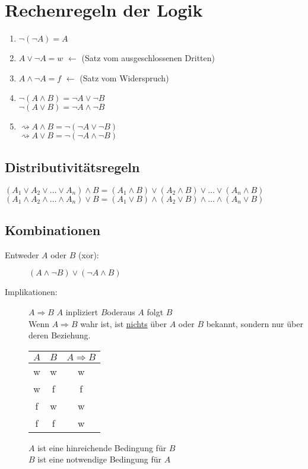 \section{Rechenregeln der Logik}
\begin{enumerate}
\item $\neg (\neg A) = A$
\item $A \vee \neg A = w$ $\leftarrow$ (Satz vom ausgeschlossenen Dritten)
\item $A \wedge \neg A = f$ $\leftarrow$ (Satz vom Widerspruch)
\item $\neg (A \wedge B) = \neg A \vee  \neg B$\\
$\neg (A \vee B) = \neg A \wedge \neg B$
\item $\rightsquigarrow A \wedge B = \neg (\neg A \vee \neg B)$\\
$\rightsquigarrow A \vee B = \neg ( \neg A \wedge \neg B)$
\end{enumerate}

\subsection{Distributivitätsregeln}
$(A_{1} \vee A_{2} \vee \dots \vee A_{n}) \wedge B = (A_{1} \wedge B ) \vee (A_{2} \wedge B) \vee \dots \vee (A_{n} \wedge B)$\\
$(A_{1} \wedge A_{2} \wedge \dots \wedge A_{n}) \vee B = (A_{1} \vee B ) \wedge (A_{2} \vee B) \wedge \dots \wedge (A_{n} \vee B)$

\subsection{Kombinationen}
\begin{description}
\item[Entweder $A$ oder $B$ (xor): ] $(A \wedge \neg B) \vee(\neg A \wedge B)$
\item[Implikationen: ] $A \Rightarrow B$ \glqq$A$ inpliziert $B$\grqq\quad oder\quad\glqq aus $A$ folgt $B$\grqq\\
Wenn $A \Rightarrow B$ wahr ist, ist \underline{nichts} über $A$ oder $B$ bekannt, sondern nur über deren Beziehung. \\
\begin{tabular}{cc|c}
 $A$ & $B$ & $A \Rightarrow B$ \\ 
\hline \rule[-2ex]{0pt}{5.5ex} w & w & w \\ 
 w & f & f \\ 
 f & w & w \\ 
 f & f & w \\ 
\end{tabular} 

$A$ ist eine hinreichende Bedingung für $B$\\
$B$ ist eine notwendige Bedingung für $A$
\end{description}


